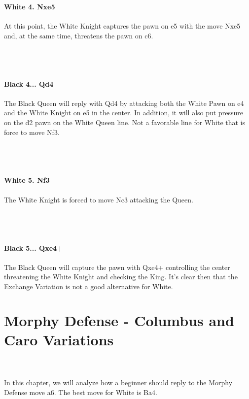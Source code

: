 \documentclass{article}
\begin{document}
\\

\\
\\
\textbf{White 4. Nxe5}\\
\\
At this point, the White Knight captures the pawn on e5 with the move Nxe5 and, at the same time, threatens the pawn on c6.\\\\
\\

\\
\\
\textbf{Black 4... Qd4}\\
\\
The Black Queen will reply with Qd4 by attacking both the White Pawn on e4 and the White Knight on e5 in the center. In addition, it will also put pressure on the d2 pawn on the White Queen line. Not a favorable line for White that is force to move Nf3.\\\\
\\

\\
\\
\textbf{White 5. Nf3}\\
\\
The White Knight is forced to move Nc3 attacking the Queen.\\\\
\\

\\
\\
\textbf{Black 5... Qxe4+}\\
\\
The Black Queen will capture the pawn with Qxe4+ controlling the center threatening the White Knight and checking the King. It's clear then that the Exchange Variation is not a good alternative for White.\\\section{ Morphy Defense - Columbus and Caro Variations}

\\
\\
In this chapter, we will analyze how a beginner should reply to the Morphy Defense move a6. The best move for White is Ba4.\\
\end{document}
